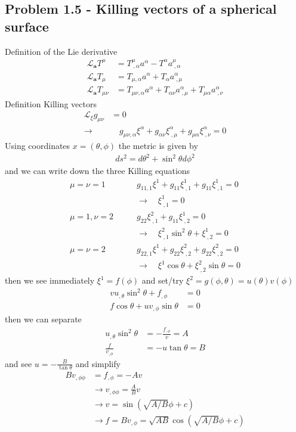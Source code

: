 \documentclass[10pt,a4paper]{book}
\theoremstyle{definition}
\begin{document}
\subsection{Problem 1.5 - Killing vectors of a spherical surface}
Definition of the Lie derivative
\begin{align}
\mathcal{L}_\mathbf{a}T^\mu&=T^\mu_{\;,\alpha}a^\alpha-T^\alpha a^\mu_{\;,\alpha}\\
\mathcal{L}_\mathbf{a}T_\mu&=T_{\mu,\alpha}a^\alpha+T_\alpha a^\alpha_{\;,\mu}\\
\mathcal{L}_\mathbf{a}T_{\mu\nu}&=T_{\mu\nu,\alpha}a^\alpha+T_{\alpha\nu} a^\alpha_{\;,\mu}+T_{\mu\alpha} a^\alpha_{\;,\nu}
\end{align}
Definition Killing vectors
\begin{align}
\mathcal{L}_\xi g_{\mu\nu}&=0\\
\rightarrow &\quad g_{\mu\nu,\alpha}\xi^\alpha+g_{\alpha\nu} \xi^\alpha_{\;,\mu}+g_{\mu\alpha} \xi^\alpha_{\;,\nu}=0
\end{align}
Using coordinates $x=(\theta,\phi)$ the metric is given by
\begin{align}
ds^2=d\theta^2+\sin^2\theta d\phi^2
\end{align}
and we can write down the three Killing equations
\begin{align}
\mu=\nu=1\qquad &g_{11,1}\xi^1+g_{11}\xi^1_{\;,1}+g_{11}\xi^1_{\;,1}=0\\
&\rightarrow\quad\xi^1_{\;,1}=0\\
\mu=1, \nu=2\qquad &g_{22}\xi^2_{\;,1}+g_{11}\xi^1_{\;,2}=0\\
&\rightarrow\quad\xi^2_{\;,1}\sin^2\theta+\xi^1_{\;,2}=0\\
\mu=\nu=2\qquad &g_{22,1}\xi^1+g_{22}\xi^2_{\;,2}+g_{22}\xi^2_{\;,2}=0\\
&\rightarrow\quad\xi^1\cos\theta+\xi^2_{\;,2}\sin\theta=0
\end{align}
then we see immediately $\xi^1=f(\phi)$ and set/try $\xi^2=g(\phi,\theta)=u(\theta)v(\phi)$
\begin{align}
vu_{,\theta}\sin^2\theta+f_{,\phi}&=0\\
f\cos\theta+uv_{,\phi}\sin\theta&=0
\end{align}
then we can separate
\begin{align}
u_{,\theta}\sin^2\theta&=-\frac{f_{,\phi}}{v}=A\\
\frac{f}{v_{,\phi}}&=-u\tan\theta=B
\end{align}
and see $u=-\frac{B}{\tan\theta}$ and simplify
\begin{align}
Bv_{,\phi\phi}&=f_{,\phi}=-Av\\
&\rightarrow v_{,\phi\phi}=\frac{A}{B}v\\
&\rightarrow v=\sin(\sqrt{A/B}\phi+c)\\
&\rightarrow f=Bv_{,\phi}=\sqrt{AB}\cos(\sqrt{A/B}\phi+c)
\end{align}
\end{document}
